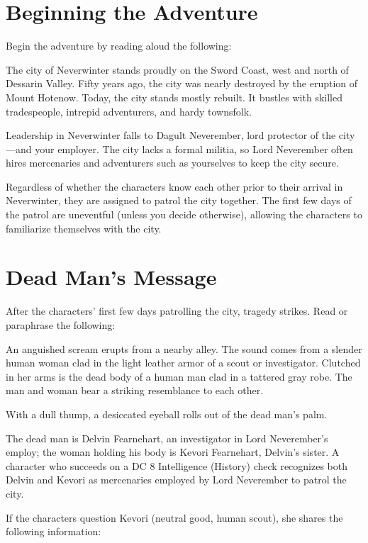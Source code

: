 \documentclass[10pt,a4paper,twoside,bg=print,twocolumn,openany,nodeprecatedcode]{dndbook}
\begin{document}
\section{Beginning the Adventure}
Begin the adventure by reading aloud the following:
\begin{DndReadAloud}{}
The city of Neverwinter stands proudly on the Sword Coast, west and north of Dessarin Valley. Fifty years ago, the city was nearly destroyed by the eruption of Mount Hotenow. Today, the city stands mostly rebuilt. It bustles with skilled tradespeople, intrepid adventurers, and hardy townsfolk.

Leadership in Neverwinter falls to Dagult Neverember, lord protector of the city—and your employer. The city lacks a formal militia, so Lord Neverember often hires mercenaries and adventurers such as yourselves to keep the city secure.
\end{DndReadAloud}

Regardless of whether the characters know each other prior to their arrival in Neverwinter, they are assigned to patrol the city together. The first few days of the patrol are uneventful (unless you decide otherwise), allowing the characters to familiarize themselves with the city.
\section{Dead Man's Message}
After the characters' first few days patrolling the city, tragedy strikes. Read or paraphrase the following:
\begin{DndReadAloud}{}
An anguished scream erupts from a nearby alley. The sound comes from a slender human woman clad in the light leather armor of a scout or investigator. Clutched in her arms is the dead body of a human man clad in a tattered gray robe. The man and woman bear a striking resemblance to each other.

With a dull thump, a desiccated eyeball rolls out of the dead man's palm.
\end{DndReadAloud}

The dead man is Delvin Fearnehart, an investigator in Lord Neverember's employ; the woman holding his body is Kevori Fearnehart, Delvin's sister. A character who succeeds on a DC 8 Intelligence (History) check recognizes both Delvin and Kevori as mercenaries employed by Lord Neverember to patrol the city.

If the characters question Kevori (neutral good, human scout), she shares the following information:
\end{document}
